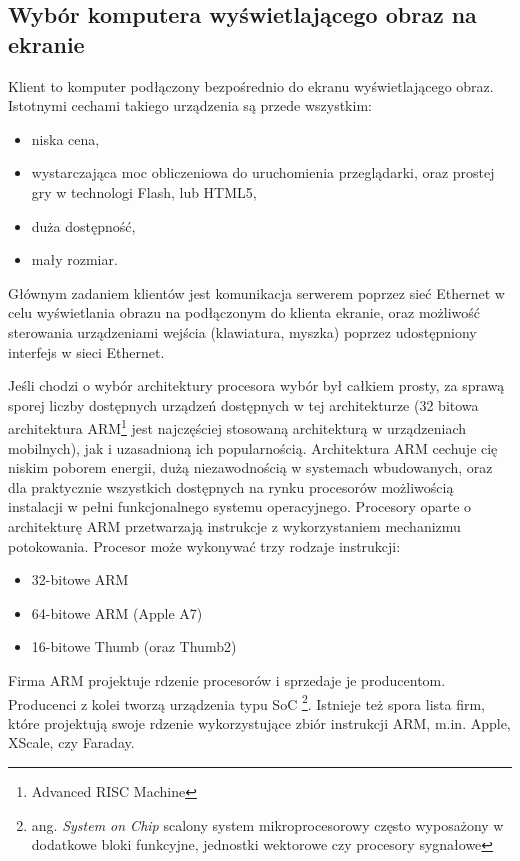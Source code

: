 \subsection{Wybór komputera wyświetlającego obraz na ekranie}
\label{sec:Komputer wyświetlający obraz na ekranie}

Klient to komputer podłączony bezpośrednio do ekranu wyświetlającego obraz. Istotnymi cechami takiego urządzenia są przede wszystkim:
\begin{itemize}
	\item niska cena,
	\item wystarczająca moc obliczeniowa do uruchomienia przeglądarki, oraz prostej gry w technologi Flash, lub HTML5,
	\item duża dostępność,
	\item mały rozmiar.
\end{itemize}

Głównym zadaniem klientów jest komunikacja serwerem poprzez sieć Ethernet w celu wyświetlania obrazu na podłączonym do klienta ekranie, oraz możliwość sterowania urządzeniami wejścia (klawiatura, myszka) poprzez udostępniony interfejs w sieci Ethernet.

Jeśli chodzi o wybór architektury procesora wybór był całkiem prosty, za sprawą sporej liczby dostępnych urządzeń dostępnych w tej architekturze (32 bitowa architektura ARM\footnote{Advanced RISC Machine} jest najczęściej stosowaną architekturą w urządzeniach mobilnych\cite{acm}), jak i uzasadnioną ich popularnością. Architektura ARM cechuje cię niskim poborem energii, dużą niezawodnością w systemach wbudowanych, oraz dla praktycznie wszystkich dostępnych na rynku procesorów możliwością instalacji w pełni funkcjonalnego systemu operacyjnego.
Procesory oparte o architekturę ARM przetwarzają instrukcje z wykorzystaniem mechanizmu potokowania. Procesor może wykonywać trzy rodzaje instrukcji:
\begin{itemize}
	\item 32-bitowe ARM
	\item 64-bitowe ARM (Apple A7)
	\item 16-bitowe Thumb (oraz Thumb2)
\end{itemize}

\par
Firma ARM projektuje rdzenie procesorów i sprzedaje je producentom. Producenci z kolei tworzą urządzenia typu SoC \footnote{ang. \emph{System on Chip} scalony system mikroprocesorowy często wyposażony w dodatkowe bloki funkcyjne, jednostki wektorowe czy procesory sygnałowe}. Istnieje też spora lista firm, które projektują swoje rdzenie wykorzystujące zbiór instrukcji ARM, m.in. Apple, XScale, czy Faraday.

